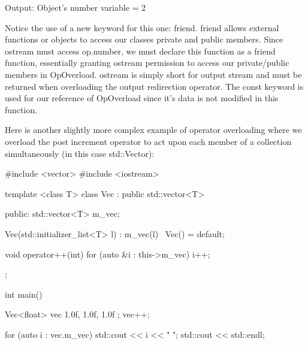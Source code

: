 \documentclass{article}
\begin{document}
Output: Object’s number variable = 2

Notice the use of a new keyword for this one: friend. friend allows external functions or objects to access
our classes private and public members. Since ostream must access op.number, we must declare this function as
a friend function, essentially granting ostream permission to access our private/public members in OpOverload.
ostream is simply short for output stream and must be returned when overloading the output redirection
operator. The const keyword is used for our reference of OpOverload since it’s data is not modified in this
function.

Here is another slightly more complex example of operator overloading where we overload the post increment
operator to act upon each member of a collection simultaneously (in this case std::Vector):

\begin{cpplst}

#include <vector>
#include <iostream>

template <class T>
class Vec : public std::vector<T>
{
public:
   std::vector<T> m_vec;

   Vec(std::initializer_list<T> l) : m_vec(l) {}
   ~Vec() = default;

   void operator++(int)
   {
       for (auto &i : this->m_vec)
       {
           i++;
       }
   }
};

int main()
{
    Vec<float> vec{ 1.0f, 1.0f, 1.0f };
    vec++;

    for (auto i : vec.m_vec)
    {
        std::cout << i << " ";
    }
    std::cout << std::endl;
}

\end{cpplst}
\end{document}

